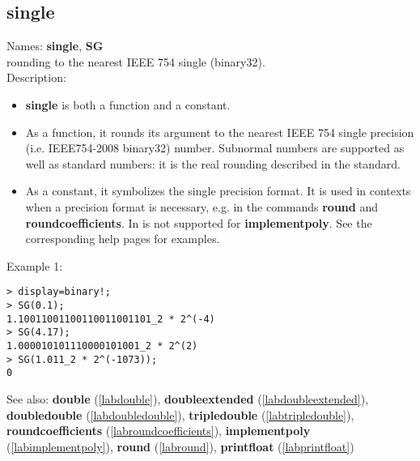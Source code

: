 \subsection{single}
\label{labsingle}
\noindent Names: \textbf{single}, \textbf{SG}\\
rounding to the nearest IEEE 754 single (binary32).\\
\noindent Description: \begin{itemize}

\item \textbf{single} is both a function and a constant.

\item As a function, it rounds its argument to the nearest IEEE 754 single precision (i.e. IEEE754-2008 binary32) number.
   Subnormal numbers are supported as well as standard numbers: it is the real
   rounding described in the standard.

\item As a constant, it symbolizes the single precision format. It is used in 
   contexts when a precision format is necessary, e.g. in the commands 
   \textbf{round} and \textbf{roundcoefficients}. In is not supported for \textbf{implementpoly}.
   See the corresponding help pages for examples.
\end{itemize}
\noindent Example 1: 
\begin{center}\begin{minipage}{15cm}\begin{Verbatim}[frame=single]
> display=binary!;
> SG(0.1);
1.10011001100110011001101_2 * 2^(-4)
> SG(4.17);
1.000010101110000101001_2 * 2^(2)
> SG(1.011_2 * 2^(-1073));
0
\end{Verbatim}
\end{minipage}\end{center}
See also: \textbf{double} (\ref{labdouble}), \textbf{doubleextended} (\ref{labdoubleextended}), \textbf{doubledouble} (\ref{labdoubledouble}), \textbf{tripledouble} (\ref{labtripledouble}), \textbf{roundcoefficients} (\ref{labroundcoefficients}), \textbf{implementpoly} (\ref{labimplementpoly}), \textbf{round} (\ref{labround}), \textbf{printfloat} (\ref{labprintfloat})
